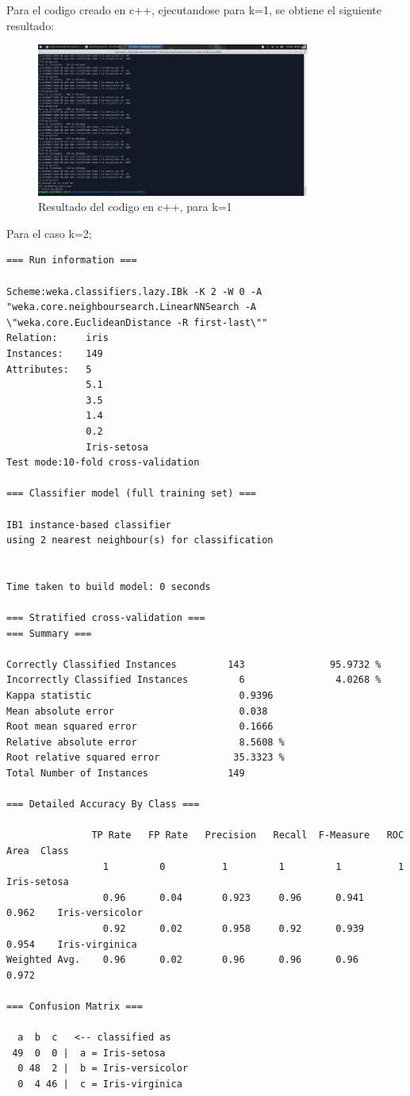 \documentclass[12pt,letterpaper]{article}
\begin{document}
Para el codigo creado en c++, ejecutandose para k=1, se obtiene el siguiente resultado:

\begin{figure}[H]
    \centering
    \includegraphics[width=0.8\textwidth]{knnc++1.jpg}
    \caption{Resultado del codigo en c++, para k=1}
    \label{fig:1}
\end{figure}

Para el caso k=2;

\begin{lstlisting}
=== Run information ===

Scheme:weka.classifiers.lazy.IBk -K 2 -W 0 -A "weka.core.neighboursearch.LinearNNSearch -A \"weka.core.EuclideanDistance -R first-last\""
Relation:     iris
Instances:    149
Attributes:   5
              5.1
              3.5
              1.4
              0.2
              Iris-setosa
Test mode:10-fold cross-validation

=== Classifier model (full training set) ===

IB1 instance-based classifier
using 2 nearest neighbour(s) for classification


Time taken to build model: 0 seconds

=== Stratified cross-validation ===
=== Summary ===

Correctly Classified Instances         143               95.9732 %
Incorrectly Classified Instances         6                4.0268 %
Kappa statistic                          0.9396
Mean absolute error                      0.038 
Root mean squared error                  0.1666
Relative absolute error                  8.5608 %
Root relative squared error             35.3323 %
Total Number of Instances              149     

=== Detailed Accuracy By Class ===

               TP Rate   FP Rate   Precision   Recall  F-Measure   ROC Area  Class
                 1         0          1         1         1          1        Iris-setosa
                 0.96      0.04       0.923     0.96      0.941      0.962    Iris-versicolor
                 0.92      0.02       0.958     0.92      0.939      0.954    Iris-virginica
Weighted Avg.    0.96      0.02       0.96      0.96      0.96       0.972

=== Confusion Matrix ===

  a  b  c   <-- classified as
 49  0  0 |  a = Iris-setosa
  0 48  2 |  b = Iris-versicolor
  0  4 46 |  c = Iris-virginica
\end{lstlisting}
\end{document}

